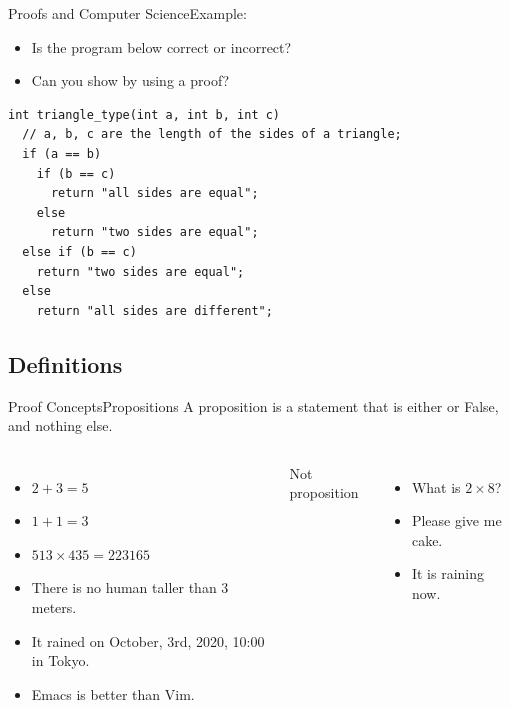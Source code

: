 \begin{frame}[fragile]{Proofs and Computer Science}{Example:}
  \begin{itemize}
    \item Is the program below correct or incorrect?
    \item Can you show by using a proof?
  \end{itemize}

\begin{verbatim}
int triangle_type(int a, int b, int c)
  // a, b, c are the length of the sides of a triangle;
  if (a == b)
    if (b == c)
      return "all sides are equal";
    else
      return "two sides are equal";
  else if (b == c)
    return "two sides are equal";
  else
    return "all sides are different";
\end{verbatim}
\end{frame}

\subsection{Definitions}

\begin{frame}{Proof Concepts}{Propositions}
  A proposition is a statement that is either  or \alert{False}, and nothing else.\bigskip

  \begin{columns}[T]
    \begin{itemize}
      \item $2 + 3 = 5$
      \item $1 + 1 = 3$
      \item $513 \times 435 = 223165$
      \item There is no human taller than 3 meters.
      \item It rained on October, 3rd, 2020, 10:00 in Tokyo.
      \item Emacs is better than Vim.
    \end{itemize}
    \alert{Not proposition}
    \begin{itemize}
      \item What is $2 \times 8$?
      \item Please give me cake.
      \item It is raining now.
    \end{itemize}
  \end{columns}
\end{frame}

